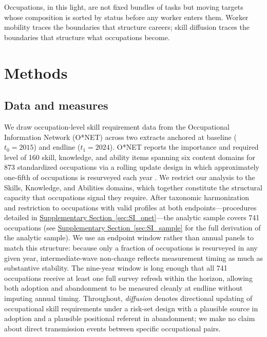 \documentclass[11pt, letterpaper]{article} %
\newcommand{\parencite}[1]{\cite{#1}}
\begin{document}
Occupations, in this light, are not fixed bundles of tasks but moving targets whose composition is sorted by status before any worker enters them. Worker mobility traces the boundaries that structure careers; skill diffusion traces the boundaries that structure what occupations become.

\section*{Methods}

\subsection*{Data and measures}
 
We draw occupation-level skill requirement data from the Occupational Information Network (O*NET) across two extracts anchored at baseline ($t_0 = 2015$) and endline ($t_1 = 2024$). O*NET reports the importance and required level of 160 skill, knowledge, and ability items spanning six content domains for 873 standardized occupations via a rolling update design in which approximately one-fifth of occupations is resurveyed each year \parencite{alabdulkareem_unpacking_2018}. We restrict our analysis to the Skills, Knowledge, and Abilities domains, which together constitute the structural capacity that occupations signal they require. After taxonomic harmonization and restriction to occupations with valid profiles at both endpoints---procedures detailed in \hyperref[sec:SI_onet]{Supplementary Section~\ref*{sec:SI_onet}}---the analytic sample covers 741 occupations (see \hyperref[sec:SI_sample]{Supplementary Section~\ref*{sec:SI_sample}} for the full derivation of the analytic sample). We use an endpoint window rather than annual panels to match this structure: because only a fraction of occupations is resurveyed in any given year, intermediate-wave non-change reflects measurement timing as much as substantive stability. The nine-year window is long enough that all 741 occupations receive at least one full survey refresh within the horizon, allowing both adoption and abandonment to be measured cleanly at endline without imputing annual timing. Throughout, \textit{diffusion} denotes directional updating of occupational skill requirements under a risk-set design with a plausible source in adoption and a plausible positional referent in abandonment; we make no claim about direct transmission events between specific occupational pairs.
 
\end{document}
